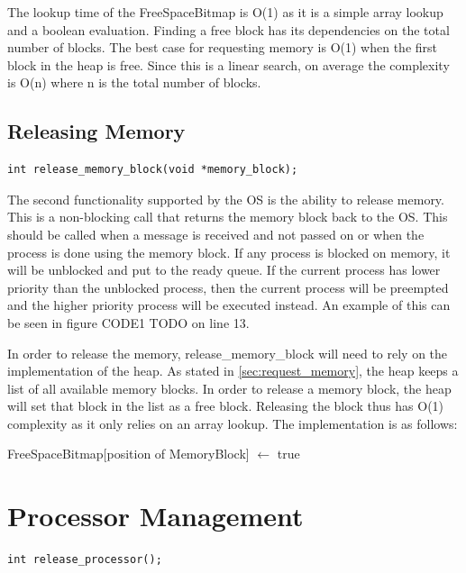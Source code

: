 \documentclass[12pt]{report}
\begin{document}
The lookup time of the FreeSpaceBitmap is O(1) as it is a simple array lookup and a boolean evaluation. Finding a free block has its dependencies on the total number of blocks. The best case for requesting memory is O(1) when the first block in the heap is free. Since this is a linear search, on average the complexity is O(n) where n is the total number of blocks.

\bigskip

\subsection{Releasing Memory}
\begin{lstlisting}
int release_memory_block(void *memory_block);
\end{lstlisting}

\par The second functionality supported by the OS is the ability to release memory. This is a non-blocking call that returns the memory block back to the OS. This should be called when a message is received and not passed on or when the process is done using the memory block. If any process is blocked on memory, it will be unblocked and put to the ready queue. If the current process has lower priority than the unblocked process, then the current process will be preempted and the higher priority process will be executed instead. An example of this can be seen in figure CODE1 TODO on line 13.

\par In order to release the memory, release\_memory\_block will need to rely on the implementation of the heap. As stated in \ref{sec:request_memory}, the heap keeps a list of all available memory blocks. In order to release a memory block, the heap will set that block in the list as a free block. Releasing the block thus has O(1) complexity as it only relies on an array lookup. The implementation is as follows:
\begin{algorithmic}
    \State FreeSpaceBitmap[position of MemoryBlock] $\gets$ true
  \EndFunction
\end{algorithmic}

\bigskip

\section{Processor Management}
\begin{lstlisting}
int release_processor();
\end{lstlisting}
\end{document}
